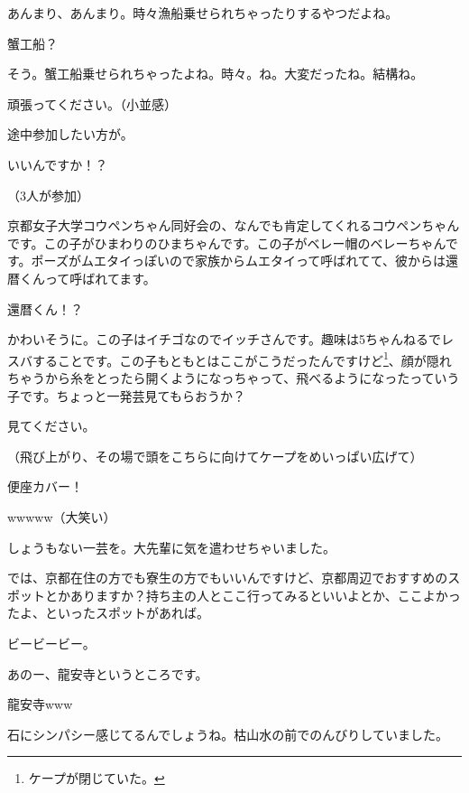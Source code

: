 \documentclass[9pt,4aj]{jsarticle}
\begin{document}
\begin{multicols}{2}
あんまり、あんまり。時々漁船乗せられちゃったりするやつだよね。

蟹工船？

そう。蟹工船乗せられちゃったよね。時々。ね。大変だったね。結構ね。

頑張ってください。（小並感）

途中参加したい方が。

いいんですか！？

（3人が参加）

京都女子大学コウペンちゃん同好会の、なんでも肯定してくれるコウペンちゃんです。この子がひまわりのひまちゃんです。この子がベレー帽のベレーちゃんです。ポーズがムエタイっぽいので家族からムエタイって呼ばれてて、彼からは還暦くんって呼ばれてます。

還暦くん！？

かわいそうに。この子はイチゴなのでイッチさんです。趣味は5ちゃんねるでレスバすることです。この子もともとはここがこうだったんですけど\footnote{ケープが閉じていた。}、顔が隠れちゃうから糸をとったら開くようになっちゃって、飛べるようになったっていう子です。ちょっと一発芸見てもらおうか？

見てください。

（飛び上がり、その場で頭をこちらに向けてケープをめいっぱい広げて）

便座カバー！

wwwww（大笑い）

しょうもない一芸を。大先輩に気を遣わせちゃいました。

では、京都在住の方でも寮生の方でもいいんですけど、京都周辺でおすすめのスポットとかありますか？持ち主の人とここ行ってみるといいよとか、ここよかったよ、といったスポットがあれば。

ビービービー。

あのー、龍安寺というところです。

龍安寺www

石にシンパシー感じてるんでしょうね。枯山水の前でのんびりしていました。


\end{multicols}
\end{document}
